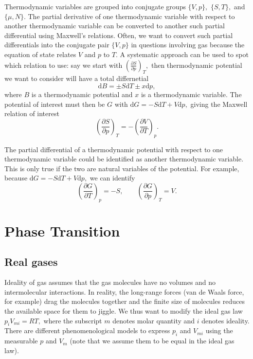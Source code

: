 \documentclass{article}
\theoremstyle{nonumberplain}
\begin{document}
Thermodynamic variables are grouped into conjugate groups $\{V,p\},$ $\{S,T\},$ and $\{\mu ,N\}.$ The partial derivative of one thermodynamic variable with respect to another thermodynamic variable can be converted to another such partial differential using Maxwell's relations. Often, we want to convert such partial differentials into the conjugate pair $\{V,p\}$ in questions involving gas because the equation of state relates $V$ and $p$ to $T.$ A systematic approach can be used to spot which relation to use: say we start with 
\(
    \left( \frac{\partial S}{\partial p} \right)_{T}, 
\)
then thermodynamic potential we want to consider will have a total differnetial
\[
    \mathrm{d} B = \pm S \mathrm{d} T \pm x \mathrm{d} p, 
\]
where $B$ is a thermodynamic potential and $x$ is a thermodynamic variable. The potential of interest must then be $G$ with $\mathrm{d} G = -S\mathrm{d} T + V \mathrm{d} p,$ giving the Maxwell relation of interest
\[
    \left( \frac{\partial S}{\partial p} \right)_{T} = 
    -\left( \frac{\partial V}{\partial T} \right)_{p}. 
\]

The partial differential of a thermodynamic potential with respect to one thermodynamic variable could be identified as another thermodynamic variable. This is only true if the two are natural variables of the potential. For example, because \(\mathrm{d} G = -S\mathrm{d} T + V \mathrm{d} p,\) we can identify
\[
    \left( \frac{\partial G}{\partial T} \right)_{p} = -S, 
    \qquad
    \left( \frac{\partial G}{\partial p} \right)_{T} = V.
\]
\section{Phase Transition}
\subsection{Real gases}
Ideality of gas assumes that the gas molecules have no volumes and no intermolecular interactions. In reality, the long-range forces (van de Waals force, for example) drag the molecules together and the finite size of molecules reduces the available space for them to jiggle. We thus want to modify the ideal gas law $p_i V_{mi} = R T,$ where the subscript $m$ denotes molar quantity and $i$ denotes ideality. There are different phenomenological models to express $p_i$ and $V_{mi}$ using the measurable $p$ and $V_m$ (note that we assume them to be equal in the ideal gas law). 
\end{document}
